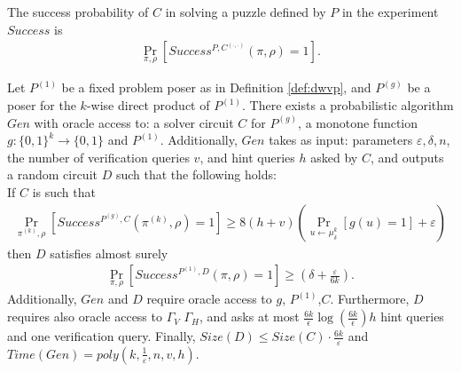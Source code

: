 %
The success probability of $C$ in solving a puzzle defined by $P$ in the experiment $Success$ is
\begin{align}
 \underset{\pi, \rho}{\Pr}[Success^{P,C^{(\cdot, \cdot)}}(\pi, \rho) = 1].
\end{align}
%
\begin{theorem}
\label{th:sec_amp_for_dwvp}
Let $P^{(1)}$ be a fixed problem poser as in Definition \ref{def:dwvp}, and $P^{(g)}$ be a poser for the $k$-wise direct product of $P^{(1)}$.
There exists a probabilistic algorithm $Gen$ with oracle access to: a solver circuit $C$ for $P^{(g)}$,
a monotone function $g:\{0,1\}^k \rightarrow \{0,1\}$ and $P^{(1)}$. Additionally, $Gen$ takes as input: parameters $\varepsilon, \delta, n$,
the number of verification queries $v$, and hint queries $h$ asked by $C$, and outputs a random circuit $D$
such that the following holds: \\
If $C$ is such that \\
  \begin{align*}
    \underset{\pi^{(k)}, \rho}{\Pr}\left[Success^{P^{(g)}, C}(\pi^{(k)}, \rho) = 1\right] \geq 8(h+v)\left(\underset{u \leftarrow \mu_\delta^k}{\Pr}\left[g(u) = 1\right] + \varepsilon\right)
  \end{align*}
then $D$ satisfies almost surely
  \begin{align*}
    \underset{\pi, \rho}{\Pr}\left[Success^{P^{(1)},D}(\pi, \rho) = 1\right] \geq (\delta + \frac{\varepsilon}{6k}).
  \end{align*}
Additionally, $Gen$ and $D$ require oracle access to $g$, $P^{(1)}$,$C$.
Furthermore, $D$ requires also oracle access to $\Gamma_V$ $\Gamma_H$,
and asks at most $\frac{6k}{\epsilon}\log\left(\frac{6k}{\epsilon}\right) h$ hint queries and one verification query.
Finally, $Size(D) \leq Size(C) \cdot \frac{6k}{\varepsilon}$ and $Time(Gen) = poly(k, \frac{1}{\varepsilon}, n, v, h)$.
\end{theorem}
%


